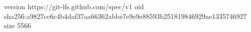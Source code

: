 version https://git-lfs.github.com/spec/v1
oid sha256:a9827cc6c4b4daf37aa66362abbe7e9e9e88593b251819846929ae1335746927
size 5566
